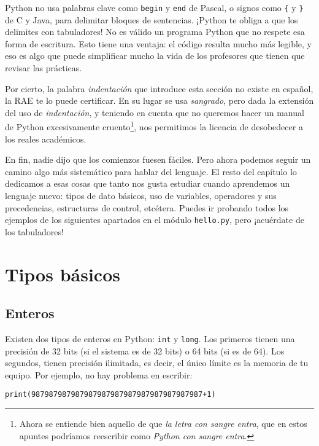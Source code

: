 Python no usa palabras clave como \texttt{begin} y \texttt{end} de Pascal, o signos como \texttt{\{} y \texttt{\}} de C y Java, para delimitar bloques de sentencias. ¡Python te obliga a que los delimites con tabuladores! No es válido un programa Python que no respete esa forma de escritura. Esto tiene una ventaja: el código resulta mucho más legible, y eso es algo que puede simplificar mucho la vida de los profesores que tienen que revisar las prácticas.

Por cierto, la palabra \emph{indentación} que introduce esta sección no existe en español, la RAE te lo puede certificar. En su lugar se usa \emph{sangrado}, pero dada la extensión del uso de \emph{indentación}, y teniendo en cuenta que no queremos hacer un manual de Python excesivamente cruento\footnote{Ahora se entiende bien aquello de que \emph{la letra con sangre entra}, que en estos apuntes podríamos reescribir como \emph{Python con sangre entra}.}, nos permitimos la licencia de desobedecer a los reales académicos.

En fin, nadie dijo que los comienzos fuesen fáciles. Pero ahora podemos seguir un camino algo más sistemático para hablar del lenguaje. El resto del capítulo lo dedicamos a esas cosas que tanto nos gusta estudiar cuando aprendemos un lenguaje nuevo: tipos de dato básicos, uso de variables, operadores y sus precedencias, estructuras de control, etcétera. Puedes ir probando todos los ejemplos de los siguientes apartados en el módulo \texttt{hello.py}, pero ¡acuérdate de los tabuladores!

\section{Tipos básicos}\label{sec:tiposBasicos}

\subsection{Enteros}

Existen dos tipos de enteros en Python: \texttt{int} y \texttt{long}. Los primeros tienen una precisión de 32 bits (si el sistema es de 32 bits) o 64 bits (si es de 64). Los segundos, tienen precisión ilimitada, es decir, el único límite es la memoria de tu equipo. Por ejemplo, no hay problema en escribir:

\begin{lstlisting}
print(987987987987987987987987987987987987987+1)
\end{lstlisting}

